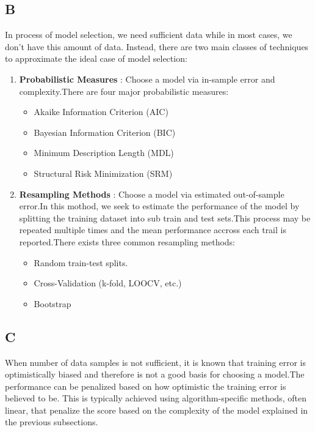 \documentclass{article}
\begin{document}
 \subsection*{B}
In process of model selection, we need sufficient data while in most cases, we don't have this amount of data.
Instead, there are two main classes of techniques to approximate the ideal case of model selection:
\begin{enumerate}
    \item \textbf{Probabilistic Measures} :  Choose a model via in-sample error and complexity.There are four major probabilistic measures:
    \begin{itemize}
        \item Akaike Information Criterion (AIC)
        \item Bayesian Information Criterion (BIC)
        \item Minimum Description Length (MDL)
        \item Structural Risk Minimization (SRM)
    \end{itemize}
    \item \textbf{Resampling Methods} : Choose a model via estimated out-of-sample error.In this mothod, we seek to estimate the performance of the model
    by splitting the training dataset into sub train and test sets.This process may be repeated multiple times and the mean performance accross each trail
    is reported.There exists three common resampling methods:
    \begin{itemize}
        \item Random train-test splits.
        \item Cross-Validation (k-fold, LOOCV, etc.)
        \item Bootstrap
    \end{itemize}
\end{enumerate}

\subsection*{C}
When number of data samples is not sufficient, it is known that training error is optimistically biased and therefore is not a good 
basis for choosing a model.The performance can be penalized based on how optimistic the training error is believed to be. This is typically achieved using algorithm-specific methods, often linear, that penalize the score based on the complexity of the model explained in the previous subsections.
\end{document}
